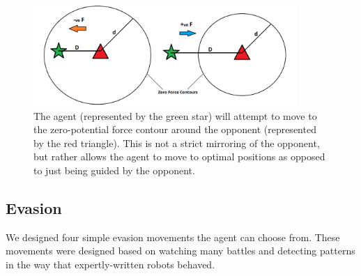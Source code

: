 \documentclass{article}
\theoremstyle{plain}
\theoremstyle{definition}
\theoremstyle{remark}
\begin{document}
\begin{figure}[t]
	\centering
		\includegraphics[width= 10cm]{mirror}
		\caption{The agent (represented by the green star) will attempt to move to the zero-potential force contour around the opponent (represented by the red triangle). This is not a strict mirroring of the opponent, but rather allows the agent to move to optimal positions as opposed to just being guided by the opponent.}		
	\label{mirror}
\end{figure}



\subsection*{Evasion}
We designed four simple evasion movements the agent can choose from. These movements were designed based on watching many battles and detecting patterns in the way that expertly-written robots behaved.
\end{document}
